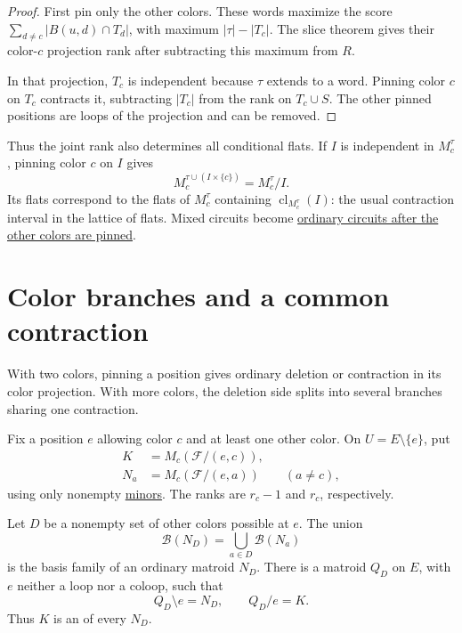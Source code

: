 \begin{proof}
First pin only the other colors. These words maximize the score
$\sum_{d\ne c}|B(u,d)\cap T_d|$, with maximum $|\tau|-|T_c|$.
The slice theorem gives their color-$c$ projection rank after
subtracting this maximum from $R$.

In that projection, $T_c$ is independent because $\tau$ extends to
a word. Pinning color $c$ on $T_c$ contracts it, subtracting $|T_c|$
from the rank on $T_c\cup S$. The other pinned positions are loops
of the projection and can be removed.
\end{proof}

Thus the joint rank also determines all conditional flats. If $I$ is
independent in $M_c^\tau$, pinning color $c$ on $I$ gives
\[
 M_c^{\tau\cup(I\times\{c\})}=M_c^\tau/I.
\]
Its flats correspond to the flats of $M_c^\tau$ containing
$\operatorname{cl}_{M_c^\tau}(I)$: the usual contraction interval in
the lattice of flats. Mixed circuits become
\href{independence.htm#conditionalCircuits}{ordinary circuits after
the other colors are pinned}.

\section[branchQuotients]{Color branches and a common contraction}

With two colors, pinning a position gives ordinary deletion or
contraction in its color projection. With more colors, the deletion
side splits into several branches sharing one contraction.

Fix a position $e$ allowing color $c$ and at least one other color.
On $U=E\setminus\{e\}$, put
\[
 \begin{aligned}
 K&=M_c(\mathcal F/(e,c)),\\
 N_a&=M_c(\mathcal F/(e,a))\qquad(a\ne c),
 \end{aligned}
\]
using only nonempty \href{operations.htm#deletionAndContraction}{minors}.
The ranks are $r_c-1$ and $r_c$, respectively.

\begin{theorem}
Let $D$ be a nonempty set of other colors possible at $e$. The union
\[
 \mathcal B(N_D)=\bigcup_{a\in D}\mathcal B(N_a)
\]
is the basis family of an ordinary matroid $N_D$. There is a matroid
$Q_D$ on $E$, with $e$ neither a loop nor a coloop, such that
\[
 Q_D\setminus e=N_D,\qquad Q_D/e=K.
\]
Thus $K$ is an  of every $N_D$.
\end{theorem}

